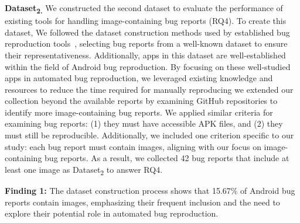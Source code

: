 \noindent
\textbf{Dataset\textsubscript{2.}}
We constructed the second dataset to evaluate the performance of existing tools for handling image-containing bug reports (RQ4). To create this dataset, We followed the dataset construction methods used by established bug reproduction tools~\cite{wang2024feedback, zhang2023automatically, zhang2024mobile, feng2024prompting}, selecting bug reports from a well-known dataset to ensure their representativeness. Additionally, apps in this dataset are well-established within the field of Android bug reproduction. By focusing on these well-studied apps in automated bug reproduction, we leveraged existing knowledge and resources to reduce the time required for manually reproducing
we extended our collection beyond the available reports by examining GitHub repositories to identify more image-containing bug reports.
We applied similar criteria for examining bug reports: (1) they must have accessible APK files, and (2) they must still be reproducible. Additionally, we included one criterion specific to our study: each bug report must contain images, aligning with our focus on image-containing bug reports. As a result, we collected 42 bug reports that include at least one image as Dataset\textsubscript{2} to answer RQ4.


\begin{tcolorbox}[colback=blue!5, colframe=black, boxrule=0.5pt]
\textbf{Finding 1:} The dataset construction process shows that 15.67\% of Android bug reports contain images, emphasizing their frequent inclusion and the need to explore their potential role in automated bug reproduction.
\end{tcolorbox}



